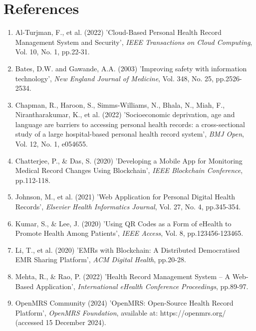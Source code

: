 \documentclass[12pt,a4paper]{article}
\begin{document}
\newpage

\section{References}
\begin{enumerate}

\item Al-Turjman, F., et al. (2022) 'Cloud-Based Personal Health Record Management System and Security', \textit{IEEE Transactions on Cloud Computing}, Vol. 10, No. 1, pp.22-31.

\item Bates, D.W. and Gawande, A.A. (2003) 'Improving safety with information technology', \textit{New England Journal of Medicine}, Vol. 348, No. 25, pp.2526-2534.

\item Chapman, R., Haroon, S., Simms-Williams, N., Bhala, N., Miah, F., Nirantharakumar, K., et al. (2022) 'Socioeconomic deprivation, age and language are barriers to accessing personal health records: a cross-sectional study of a large hospital-based personal health record system', \textit{BMJ Open}, Vol. 12, No. 1, e054655.

\item Chatterjee, P., \& Das, S. (2020) 'Developing a Mobile App for Monitoring Medical Record Changes Using Blockchain', \textit{IEEE Blockchain Conference}, pp.112-118.

\item Johnson, M., et al. (2021) 'Web Application for Personal Digital Health Records', \textit{Elsevier Health Informatics Journal}, Vol. 27, No. 4, pp.345-354.

\item Kumar, S., \& Lee, J. (2020) 'Using QR Codes as a Form of eHealth to Promote Health Among Patients', \textit{IEEE Access}, Vol. 8, pp.123456-123465.

\item Li, T., et al. (2020) 'EMRs with Blockchain: A Distributed Democratised EMR Sharing Platform', \textit{ACM Digital Health}, pp.20-28.

\item Mehta, R., \& Rao, P. (2022) 'Health Record Management System – A Web-Based Application', \textit{International eHealth Conference Proceedings}, pp.89-97.

\item OpenMRS Community (2024) 'OpenMRS: Open-Source Health Record Platform', \textit{OpenMRS Foundation}, available at: https://openmrs.org/ (accessed 15 December 2024).


\end{enumerate}
\end{document}
